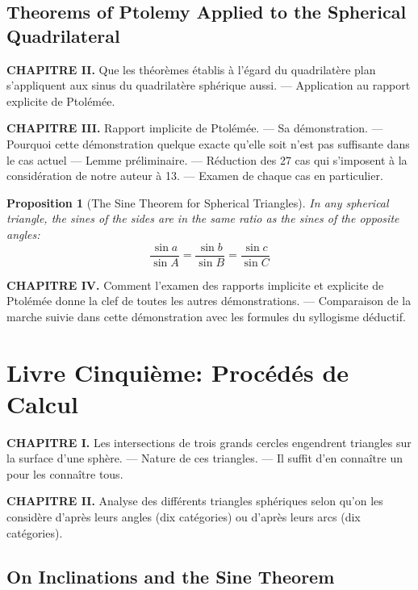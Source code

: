 \documentclass[11pt,a4paper]{article}
\theoremstyle{plain}
\newtheorem{proposition}{Proposition}[section]
\theoremstyle{definition}
\theoremstyle{remark}
\begin{document}
\subsection{Theorems of Ptolemy Applied to the Spherical Quadrilateral}
\label{sec:ptolemy}


\textbf{CHAPITRE II.} Que les théorèmes établis à l'égard du quadrilatère plan s'appliquent aux sinus du quadrilatère sphérique aussi. --- Application au rapport explicite de Ptolémée.

\textbf{CHAPITRE III.} Rapport implicite de Ptolémée. --- Sa démonstration. --- Pourquoi cette démonstration quelque exacte qu'elle soit n'est pas suffisante dans le cas actuel --- Lemme préliminaire. --- Réduction des 27 cas qui s'imposent à la considération de notre auteur à 13. --- Examen de chaque cas en particulier.


\begin{proposition}[The Sine Theorem for Spherical Triangles]
In any spherical triangle, the sines of the sides are in the same ratio as the sines of the opposite angles:
\[
\frac{\sin a}{\sin A} = \frac{\sin b}{\sin B} = \frac{\sin c}{\sin C}
\]
\end{proposition}


\textbf{CHAPITRE IV.} Comment l'examen des rapports implicite et explicite de Ptolémée donne la clef de toutes les autres démonstrations. --- Comparaison de la marche suivie dans cette démonstration avec les formules du syllogisme déductif.


\clearpage

\section{Livre Cinquième: Procédés de Calcul}
\label{sec:livre5}


\textbf{CHAPITRE I.} Les intersections de trois grands cercles engendrent triangles sur la surface d'une sphère. --- Nature de ces triangles. --- Il suffit d'en connaître un pour les connaître tous.

\textbf{CHAPITRE II.} Analyse des différents triangles sphériques selon qu'on les considère d'après leurs angles (dix catégories) ou d'après leurs arcs (dix catégories).


\subsection{On Inclinations and the Sine Theorem}
\label{sec:inclinations}
\end{document}
